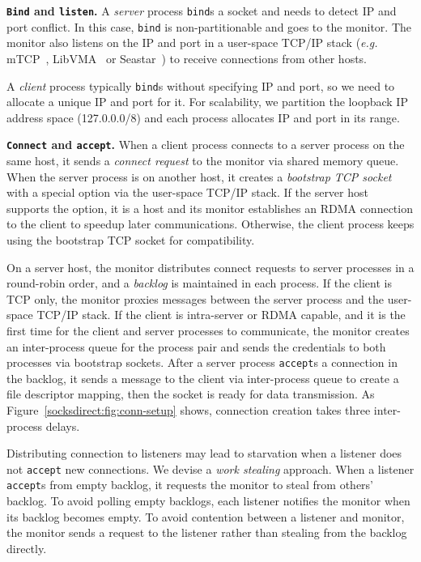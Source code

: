 \iffalse

\textbf{\texttt{Bind} and \texttt{listen}.}
A \emph{server} process \texttt{bind}s a socket and needs to detect IP and port conflict. In this case, \texttt{bind} is non-partitionable and goes to the monitor. The monitor also listens on the IP and port in a user-space TCP/IP stack (\textit{e.g.} mTCP~\cite{jeong2014mtcp}, LibVMA~\cite{libvma} or Seastar~\cite{seastar}) to receive connections from other hosts.

A \emph{client} process typically \texttt{bind}s without specifying IP and port, so we need to allocate a unique IP and port for it. For scalability, we partition the loopback IP address space (127.0.0.0/8) and each process allocates IP and port in its range.

\textbf{\texttt{Connect} and \texttt{accept}.}
When a client process connects to a server process on the same host, it sends a \textit{connect request} to the monitor via shared memory queue. When the server process is on another host, it creates a \textit{bootstrap TCP socket} with a special option via the user-space TCP/IP stack. If the server host supports the option, it is a \sys host and its monitor establishes an RDMA connection to the client to speedup later communications. Otherwise, the client process keeps using the bootstrap TCP socket for compatibility.

On a server host, the monitor distributes connect requests to server processes in a round-robin order, and a \textit{backlog} is maintained in each process. If the client is TCP only, the monitor proxies messages between the server process and the user-space TCP/IP stack. If the client is intra-server or RDMA capable, and it is the first time for the client and server processes to communicate, the monitor creates an inter-process queue for the process pair and sends the credentials to both processes via bootstrap sockets. After a server process \texttt{accept}s a connection in the backlog, it sends a message to the client via inter-process queue to create a file descriptor mapping, then the socket is ready for data transmission. As Figure~\ref{socksdirect:fig:conn-setup} shows, connection creation takes three inter-process delays.

Distributing connection to listeners may lead to starvation when a listener does not \texttt{accept} new connections. We devise a \textit{work stealing} approach. When a listener \texttt{accept}s from empty backlog, it requests the monitor to steal from others' backlog. To avoid polling empty backlogs, each listener notifies the monitor when its backlog becomes empty. To avoid contention between a listener and monitor, the monitor sends a request to the listener rather than stealing from the backlog directly.

